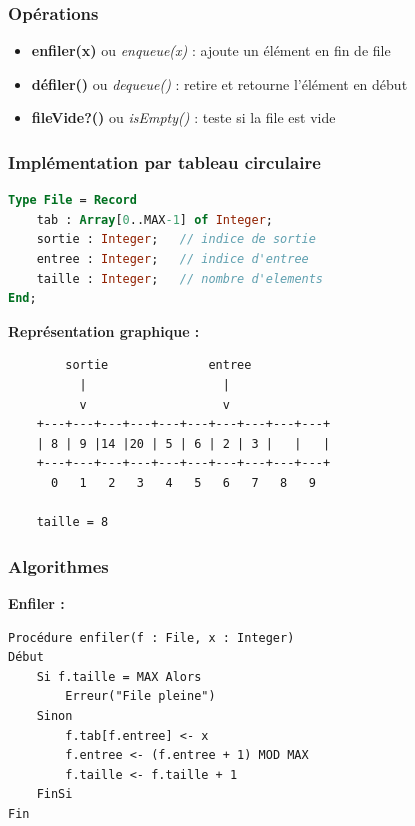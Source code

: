 \documentclass[12pt,a4paper]{article}
\begin{document}
\subsubsection{Opérations}

\begin{important}
\begin{itemize}
    \item \textbf{enfiler(x)} ou \textit{enqueue(x)} : ajoute un élément en fin de file
    \item \textbf{défiler()} ou \textit{dequeue()} : retire et retourne l'élément en début
    \item \textbf{fileVide?()} ou \textit{isEmpty()} : teste si la file est vide
\end{itemize}
\end{important}

\subsubsection{Implémentation par tableau circulaire}

\begin{lstlisting}[language=Pascal]
Type File = Record
    tab : Array[0..MAX-1] of Integer;
    sortie : Integer;   // indice de sortie
    entree : Integer;   // indice d'entree
    taille : Integer;   // nombre d'elements
End;
\end{lstlisting}

\begin{exemple}
\textbf{Représentation graphique :}
\begin{verbatim}
        sortie              entree
          |                   |
          v                   v
    +---+---+---+---+---+---+---+---+---+---+
    | 8 | 9 |14 |20 | 5 | 6 | 2 | 3 |   |   |
    +---+---+---+---+---+---+---+---+---+---+
      0   1   2   3   4   5   6   7   8   9
      
    taille = 8
\end{verbatim}
\end{exemple}

\subsubsection{Algorithmes}

\begin{algorithme}
\textbf{Enfiler :}
\begin{verbatim}
Procédure enfiler(f : File, x : Integer)
Début
    Si f.taille = MAX Alors
        Erreur("File pleine")
    Sinon
        f.tab[f.entree] <- x
        f.entree <- (f.entree + 1) MOD MAX
        f.taille <- f.taille + 1
    FinSi
Fin
\end{verbatim}
\end{algorithme}
\end{document}
